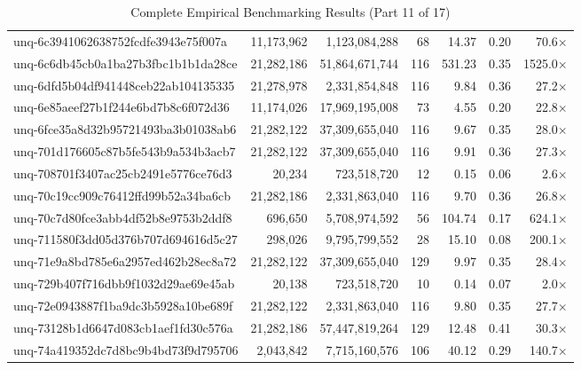 \begin{table}[h!]
\begin{tabular}{lrrrrrr}
unq-6c3941062638752fcdfe3943e75f007a & 11,173,962 & 1,123,084,288 & 68 & 14.37 & 0.20 & 70.6$\times$ \\
unq-6c6db45cb0a1ba27b3fbc1b1b1da28ce & 21,282,186 & 51,864,671,744 & 116 & 531.23 & 0.35 & 1525.0$\times$ \\
unq-6dfd5b04df941448ceb22ab104135335 & 21,278,978 & 2,331,854,848 & 116 & 9.84 & 0.36 & 27.2$\times$ \\
unq-6e85aeef27b1f244e6bd7b8c6f072d36 & 11,174,026 & 17,969,195,008 & 73 & 4.55 & 0.20 & 22.8$\times$ \\
unq-6fce35a8d32b95721493ba3b01038ab6 & 21,282,122 & 37,309,655,040 & 116 & 9.67 & 0.35 & 28.0$\times$ \\
unq-701d176605c87b5fe543b9a534b3acb7 & 21,282,122 & 37,309,655,040 & 116 & 9.91 & 0.36 & 27.3$\times$ \\
unq-708701f3407ac25cb2491e5776ce76d3 & 20,234 & 723,518,720 & 12 & 0.15 & 0.06 & 2.6$\times$ \\
unq-70c19cc909c76412ffd99b52a34ba6cb & 21,282,186 & 2,331,863,040 & 116 & 9.70 & 0.36 & 26.8$\times$ \\
unq-70c7d80fce3abb4df52b8e9753b2ddf8 & 696,650 & 5,708,974,592 & 56 & 104.74 & 0.17 & 624.1$\times$ \\
unq-711580f3dd05d376b707d694616d5c27 & 298,026 & 9,795,799,552 & 28 & 15.10 & 0.08 & 200.1$\times$ \\
unq-71e9a8bd785e6a2957ed462b28ec8a72 & 21,282,122 & 37,309,655,040 & 129 & 9.97 & 0.35 & 28.4$\times$ \\
unq-729b407f716dbb9f1032d29ae69e45ab & 20,138 & 723,518,720 & 10 & 0.14 & 0.07 & 2.0$\times$ \\
unq-72e0943887f1ba9dc3b5928a10be689f & 21,282,122 & 2,331,863,040 & 116 & 9.80 & 0.35 & 27.7$\times$ \\
unq-73128b1d6647d083cb1aef1fd30c576a & 21,282,186 & 57,447,819,264 & 129 & 12.48 & 0.41 & 30.3$\times$ \\
unq-74a419352dc7d8bc9b4bd73f9d795706 & 2,043,842 & 7,715,160,576 & 106 & 40.12 & 0.29 & 140.7$\times$ \\
\bottomrule
\end{tabular}
\caption{Complete Empirical Benchmarking Results (Part 11 of 17)}
\end{table}

\clearpage


